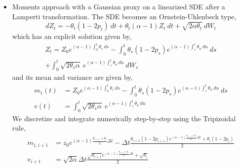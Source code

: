 \documentclass[a4paper, 12pt]{article}
\begin{document}
\begin{itemize}
\begin{itemize}
		\item Moments approach with a Gaussian proxy on a linearized SDE after a Lamperti transformation. The SDE becomes an Ornstein-Uhlenbeck  type,
		\begin{equation}
			dZ_t = - \theta_t (1-2p_t) \ dt + \theta_t(\alpha -1)  Z_t \ dt + \sqrt{2 \alpha \theta_t} \ dW_t
		\end{equation}
		which has an explicit solution given by,
		\begin{eqnarray*}
			Z_t = Z_0 e^{(\alpha-1)\int_0^t \theta_s \ ds } - \int_0^t \theta_s (1-2p_s) e^{(\alpha-1)\int_s^t \theta_u \ du } \ ds \\ + \int_0^t \sqrt{2 \theta_s \alpha} \ e^{(\alpha-1)\int_s^t \theta_u \ du } \ dW_s
	\end{eqnarray*}
	and its mean and variance are given by,
	\begin{align}
		m_1(t) &= Z_0e^{(\alpha-1)\int_0^t \theta_s \ ds } - \int_0^t \theta_s (1-2p_s) e^{(\alpha-1)\int_s^t \theta_u \ du } \ ds\\
		v(t)&= \int_0^t \sqrt{2 \theta_s \alpha} \ e^{(\alpha-1)\int_s^t \theta_u \ du }
\end{align}
We discretize and integrate numerically step-by-step using the Tripizoidal rule,
\begin{align*}
	m_{1,i+1} &= z_0 e^{(\alpha-1) \frac{\theta_{i+1}+ \theta_i}{2} \Delta t } - \Delta t \frac{\theta_{i+1}( 1-2p_{i+1} )e^{(\alpha-1) \frac{\theta_{i+1} + \theta_i}{2} \Delta t} + \theta_i (1-2p_i) }{2} \\
	v_{i+1} &= \sqrt{2 \alpha} \Delta t \frac{\sqrt{\theta_{i+1}} e^{(\alpha-1)\frac{\theta_{i+1} + \theta_i}{2}\Delta t} +\sqrt{\theta_{i}}  }{2}
\end{align*}

\end{itemize}


\end{itemize}
\end{document}
